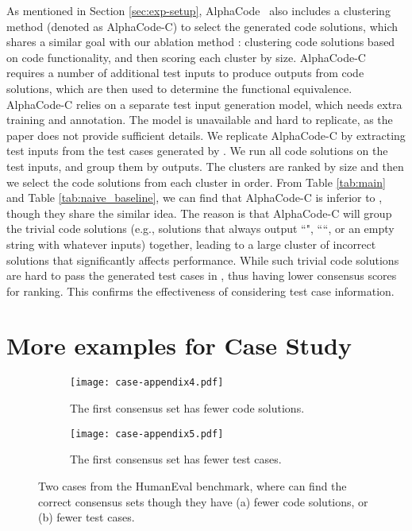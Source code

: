 As mentioned in Section \ref{sec:exp-setup}, AlphaCode~\citep{li2022competition} also includes a clustering method (denoted as AlphaCode-C) to select the generated code solutions, which shares a similar goal with our ablation method : clustering code solutions based on code functionality, and then scoring each cluster by size. AlphaCode-C requires a number of additional test inputs to produce outputs from code solutions, which are then used to determine the functional equivalence. AlphaCode-C relies on a separate test input generation model, which needs extra training and annotation. The model is unavailable and hard to replicate, as the paper does not provide sufficient details. We replicate AlphaCode-C by extracting test inputs from the test cases generated by \ours. We run all code solutions on the test inputs, and group them by outputs. The clusters are ranked by size and then we select the code solutions from each cluster in order. From Table \ref{tab:main} and Table \ref{tab:naive_baseline}, we can find that AlphaCode-C is inferior to , though they share the similar idea. The reason is that AlphaCode-C will group the trivial code solutions (e.g., solutions that always output ``", ``“, or an empty string with whatever inputs) together, leading to a large cluster of incorrect solutions that significantly affects performance. While such trivial code solutions are hard to pass the generated test cases in \ours, thus having lower consensus scores for ranking. This confirms the effectiveness of considering test case information.

\section{More examples for Case Study}
\label{appendix_code_example}

\begin{figure*}[t]
	\centering
	\begin{subfigure}[t]{0.95\linewidth}
		\centering
		\texttt{[image: case-appendix4.pdf]}
		\caption{The first consensus set has fewer code solutions.}
		\label{subfig:case_appendix4}
	\end{subfigure}
\begin{subfigure}[t]{0.95\linewidth}
		\centering
		\texttt{[image: case-appendix5.pdf]}
		\caption{The first consensus set has fewer test cases.}
		\label{subfig:case_appendix5}
	\end{subfigure}
	\caption{Two cases from the HumanEval benchmark, where \ours can find the correct consensus sets though they have (a) fewer code solutions, or (b) fewer test cases.}
	\label{fig:case_appendix4-5}
\end{figure*}


